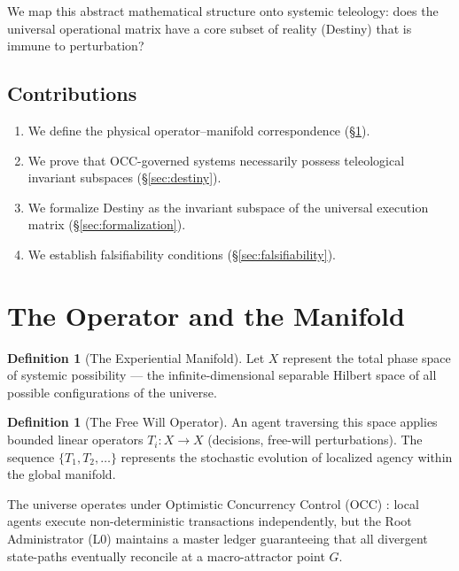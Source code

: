 \documentclass[12pt, a4paper]{article}
\theoremstyle{plain}
\theoremstyle{definition}
\newtheorem{definition}[theorem]{Definition}
\begin{document}
We map this abstract mathematical structure onto systemic teleology: does the universal operational matrix have a core subset of reality (Destiny) that is immune to perturbation?

\subsection{Contributions}
\begin{enumerate}
    \item We define the physical operator--manifold correspondence (\S\ref{sec:operator}).
    \item We prove that OCC-governed systems necessarily possess teleological invariant subspaces (\S\ref{sec:destiny}).
    \item We formalize Destiny as the invariant subspace of the universal execution matrix (\S\ref{sec:formalization}).
    \item We establish falsifiability conditions (\S\ref{sec:falsifiability}).
\end{enumerate}

\section{The Operator and the Manifold}\label{sec:operator}

\begin{definition}[The Experiential Manifold]
Let $X$ represent the total phase space of systemic possibility --- the infinite-dimensional separable Hilbert space of all possible configurations of the universe.
\end{definition}

\begin{definition}[The Free Will Operator]
An agent traversing this space applies bounded linear operators $T_i: X \to X$ (decisions, free-will perturbations). The sequence $\{T_1, T_2, \ldots\}$ represents the stochastic evolution of localized agency within the global manifold.
\end{definition}

\begin{axiom}
The universe operates under Optimistic Concurrency Control (OCC) \citep{Kung1981}: local agents execute non-deterministic transactions independently, but the Root Administrator (L0) maintains a master ledger guaranteeing that all divergent state-paths eventually reconcile at a macro-attractor point $G$.
\end{axiom}
\end{document}
